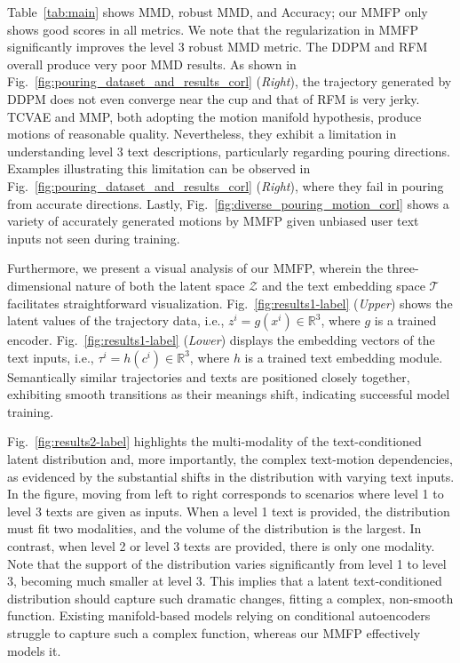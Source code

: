 {Table~\ref{tab:main} shows MMD, robust MMD, and Accuracy; our MMFP only shows good scores in all metrics. We note that the regularization in MMFP significantly improves the level 3 robust MMD metric. 
The DDPM and RFM overall produce very poor MMD results. As shown in Fig.~\ref{fig:pouring_dataset_and_results_corl} ({\it Right}), the trajectory generated by DDPM does not even converge near the cup and that of RFM is very jerky. 
TCVAE and MMP, both adopting the motion manifold hypothesis, produce motions of reasonable quality. 
Nevertheless, they exhibit a limitation in understanding level 3 text descriptions, particularly regarding pouring directions. 
Examples illustrating this limitation can be observed in Fig.~\ref{fig:pouring_dataset_and_results_corl} ({\it Right}), where they fail in pouring from accurate directions. Lastly, Fig.~\ref{fig:diverse_pouring_motion_corl} shows a variety of accurately generated motions by MMFP given unbiased user text inputs not seen during training.

Furthermore, we present a visual analysis of our MMFP, wherein the three-dimensional nature of both the latent space \(\mathcal{Z}\) and the text embedding space \(\mathcal{T}\) facilitates straightforward visualization. 
Fig.~\ref{fig:results1-label} ({\it Upper}) shows the latent values of the trajectory data, i.e., \(z^i = g(x^i) \in \mathbb{R}^{3}\), where \(g\) is a trained encoder.  
Fig.~\ref{fig:results1-label} ({\it Lower}) displays the embedding vectors of the text inputs, i.e., \(\tau^i = h(c^i) \in \mathbb{R}^{3}\), where \(h\) is a trained text embedding module.
Semantically similar trajectories and texts are positioned closely together, exhibiting smooth transitions as their meanings shift, indicating successful model training.

Fig.~\ref{fig:results2-label} highlights the multi-modality of the text-conditioned latent distribution and, more importantly, the complex text-motion dependencies, as evidenced by the substantial shifts in the distribution with varying text inputs. In the figure, moving from left to right corresponds to scenarios where level 1 to level 3 texts are given as inputs. When a level 1 text is provided, the distribution must fit two modalities, and the volume of the distribution is the largest. In contrast, when level 2 or level 3 texts are provided, there is only one modality. Note that the support of the distribution varies significantly from level 1 to level 3, becoming much smaller at level 3.
This implies that a latent text-conditioned distribution should capture such dramatic changes, fitting a complex, non-smooth function. Existing manifold-based models relying on conditional autoencoders struggle to capture such a complex function, whereas our MMFP effectively models it.

}
